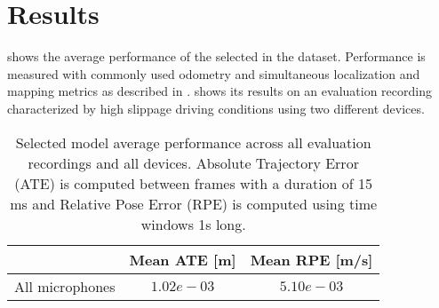\section{Results} \label{sec:results}

 shows the average performance of the
selected in the  dataset. Performance is measured
with commonly used odometry and simultaneous localization and mapping metrics
as described in \cite{Measuring2019}.  shows its results on
an evaluation recording characterized by high slippage driving conditions using
two different devices.

\begin{table}
    \centering
    \begin{tabular}{|c|c|c|}
        \hline
                        & Mean ATE [m] & Mean RPE [m/s] \\ \hline
        All microphones & $1.02e-03$   & $5.10e-03$     \\
        \hline
    \end{tabular}
    \caption[Selected model average performance across evaluation recordings
        and devices]{Selected model average performance across all evaluation
        recordings and all devices. Absolute Trajectory Error (ATE) is computed
        between frames with a duration of 15 ms and Relative Pose Error (RPE)
        is computed using time windows 1s long.}
    \label{table:results-selected-model}
\end{table}


\begin{figure*}
    \centering
\end{figure*}


